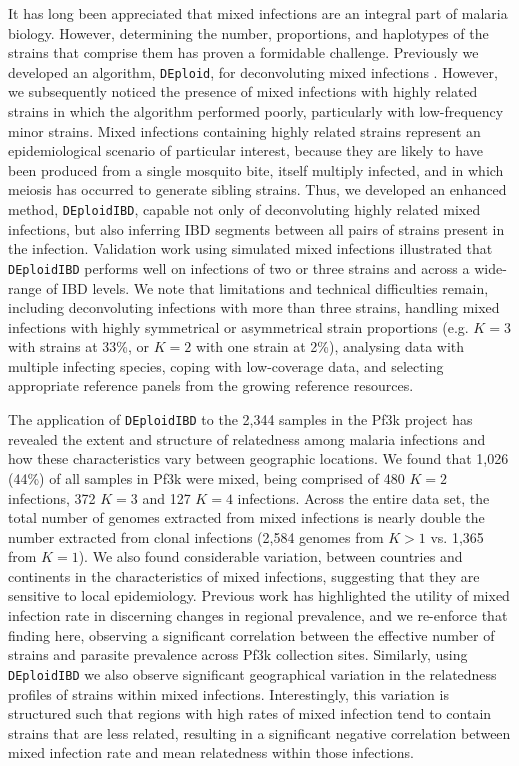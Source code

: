 \documentclass[9pt,lineno]{elife}
\begin{document}
It has long been appreciated that mixed infections are an integral part of malaria biology.  However, determining the number, proportions, and haplotypes of the strains that comprise them has proven a formidable challenge.  Previously we developed an algorithm, \texttt{DEploid}, for deconvoluting mixed infections \citep{Zhu2017}.  However, we subsequently noticed the presence of mixed infections with highly related strains in which the algorithm performed poorly, particularly with low-frequency minor strains.  Mixed infections containing highly related strains represent an epidemiological scenario of particular interest, because they are likely to have been produced from a single mosquito bite, itself multiply infected, and in which meiosis has occurred to generate sibling strains. Thus, we developed an enhanced method, \texttt{DEploidIBD}, capable not only of deconvoluting highly related mixed infections, but also inferring IBD segments between all pairs of strains present in the infection.  Validation work using simulated mixed infections illustrated that \texttt{DEploidIBD} performs well on infections of two or three strains and across a wide-range of IBD levels.  We note that limitations and technical difficulties remain, including deconvoluting infections with more than three strains, handling mixed infections with highly symmetrical or asymmetrical strain proportions (e.g. $K=3$ with strains at 33\%, or $K=2$ with one strain at 2\%), analysing data with multiple infecting species, coping with low-coverage data, and selecting appropriate reference panels from the growing reference resources.

The application of \texttt{DEploidIBD} to the 2,344 samples in the Pf3k project has revealed the extent and structure of relatedness among malaria infections and how these characteristics vary between geographic locations. We found that 1,026 (44\%) of all samples in Pf3k were mixed, being comprised of 480 $K=2$ infections, 372 $K=3$ and 127 $K=4$ infections. Across the entire data set, the total number of genomes extracted from mixed infections is nearly double the number extracted from clonal infections (2,584 genomes from $K>1$ vs. 1,365 from $K=1$).  We also found considerable variation, between countries and continents in the characteristics of mixed infections, suggesting that they are sensitive to local epidemiology.  Previous work has highlighted the utility of mixed infection rate in discerning changes in regional prevalence, and we re-enforce that finding here, observing a significant correlation between the effective number of strains and parasite prevalence across Pf3k collection sites. Similarly, using \texttt{DEploidIBD} we also observe significant geographical variation in the relatedness profiles of strains within mixed infections.  Interestingly, this variation is structured such that regions with high rates of mixed infection tend to contain strains that are less related, resulting in a significant negative correlation between mixed infection rate and mean relatedness within those infections.
\end{document}
